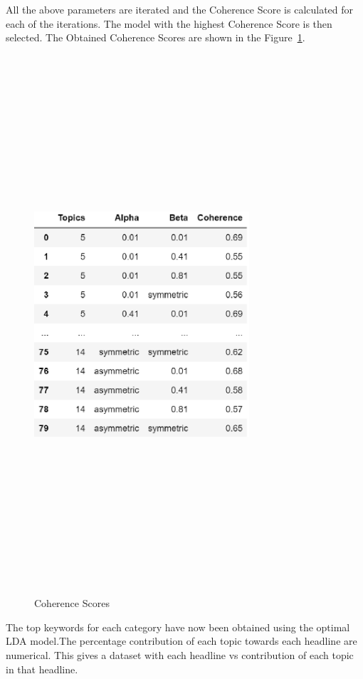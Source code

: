 \documentclass[preprint,12pt]{elsarticle}
\begin{document}
All the above parameters are iterated and the Coherence Score is calculated for each of the iterations. The model with the highest Coherence Score is then selected. The Obtained Coherence Scores are shown in the Figure~\ref{fig:coherence_scores}.

\begin{figure}[H]
\centering
\includegraphics[width=8cm,height=20cm,keepaspectratio]{Coherence_Scores.eps}
\caption{\label{fig:coherence_scores} Coherence Scores}
\end{figure}


The top keywords for each category have now been obtained using the optimal LDA model.The percentage contribution of each topic towards each headline are numerical. This gives a dataset with each headline vs contribution of each topic in that headline.
\end{document}
